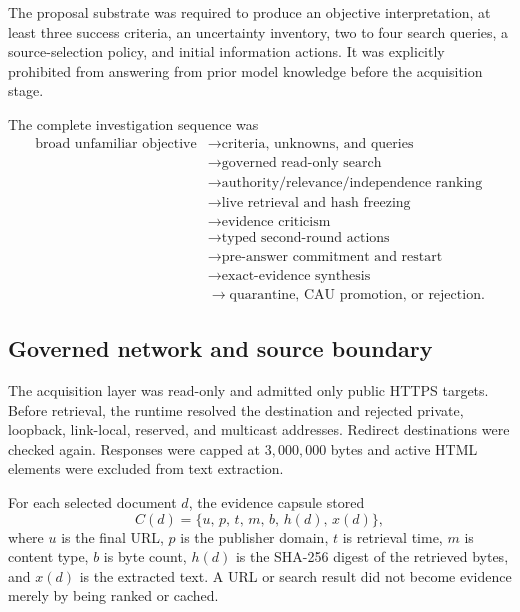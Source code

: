 The proposal substrate was required to produce an objective interpretation,
at least three success criteria, an uncertainty inventory, two to four search
queries, a source-selection policy, and initial information actions.  It was
explicitly prohibited from answering from prior model knowledge before the
acquisition stage.

The complete investigation sequence was
\begin{equation}
\begin{split}
\text{broad unfamiliar objective}
&\rightarrow \text{criteria, unknowns, and queries} \\
&\rightarrow \text{governed read-only search} \\
&\rightarrow \text{authority/relevance/independence ranking} \\
&\rightarrow \text{live retrieval and hash freezing} \\
&\rightarrow \text{evidence criticism} \\
&\rightarrow \text{typed second-round actions} \\
&\rightarrow \text{pre-answer commitment and restart} \\
&\rightarrow \text{exact-evidence synthesis} \\
&\rightarrow \text{quarantine, CAU promotion, or rejection}.
\end{split}
\label{eq:arena-v2-investigation-cycle}
\end{equation}


\subsection{Governed network and source boundary}
\label{subsec:arena-v2-network-boundary}

The acquisition layer was read-only and admitted only public HTTPS targets.
Before retrieval, the runtime resolved the destination and rejected private,
loopback, link-local, reserved, and multicast addresses.  Redirect destinations
were checked again.  Responses were capped at $3{,}000{,}000$ bytes and active
HTML elements were excluded from text extraction.

For each selected document $d$, the evidence capsule stored
\begin{equation}
C(d)=\{u,\,p,\,t,\,m,\,b,\,h(d),\,x(d)\},
\label{eq:arena-v2-source-capsule}
\end{equation}
where $u$ is the final URL, $p$ is the publisher domain, $t$ is retrieval time,
$m$ is content type, $b$ is byte count, $h(d)$ is the SHA-256 digest of the
retrieved bytes, and $x(d)$ is the extracted text.  A URL or search result did
not become evidence merely by being ranked or cached.

